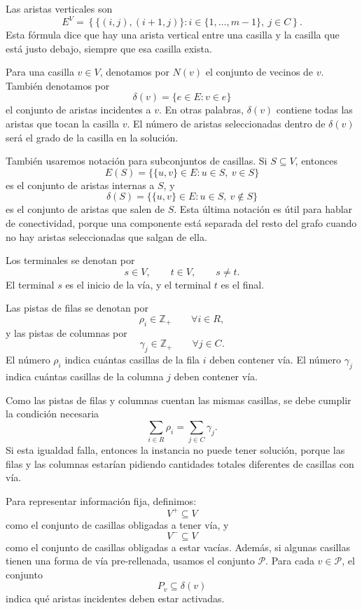Las aristas verticales son
\[
    E^V =
    \left\{
        \{(i,j),(i+1,j)\} :
        i \in \{1,\dots,m-1\},\ j \in C
    \right\}.
\]
Esta fórmula dice que hay una arista vertical entre una casilla y la casilla que está justo debajo, siempre que esa casilla exista.

Para una casilla \(v \in V\), denotamos por \(N(v)\) el conjunto de vecinos de \(v\). También denotamos por
\[
    \delta(v) = \{e \in E : v \in e\}
\]
el conjunto de aristas incidentes a \(v\). En otras palabras, \(\delta(v)\) contiene todas las aristas que tocan la casilla \(v\). El número de aristas seleccionadas dentro de \(\delta(v)\) será el grado de la casilla en la solución.

También usaremos notación para subconjuntos de casillas. Si \(S \subseteq V\), entonces
\[
    E(S) = \{\{u,v\} \in E : u \in S,\ v \in S\}
\]
es el conjunto de aristas internas a \(S\), y
\[
    \delta(S) = \{\{u,v\} \in E : u \in S,\ v \notin S\}
\]
es el conjunto de aristas que salen de \(S\). Esta última notación es útil para hablar de conectividad, porque una componente está separada del resto del grafo cuando no hay aristas seleccionadas que salgan de ella.

Los terminales se denotan por
\[
    s \in V,
    \qquad
    t \in V,
    \qquad
    s \neq t.
\]
El terminal \(s\) es el inicio de la vía, y el terminal \(t\) es el final.

Las pistas de filas se denotan por
\[
    \rho_i \in \mathbb{Z}_{+}
    \qquad \forall i \in R,
\]
y las pistas de columnas por
\[
    \gamma_j \in \mathbb{Z}_{+}
    \qquad \forall j \in C.
\]
El número \(\rho_i\) indica cuántas casillas de la fila \(i\) deben contener vía. El número \(\gamma_j\) indica cuántas casillas de la columna \(j\) deben contener vía.

Como las pistas de filas y columnas cuentan las mismas casillas, se debe cumplir la condición necesaria
\[
    \sum_{i \in R} \rho_i
    =
    \sum_{j \in C} \gamma_j.
\]
Si esta igualdad falla, entonces la instancia no puede tener solución, porque las filas y las columnas estarían pidiendo cantidades totales diferentes de casillas con vía.

Para representar información fija, definimos:
\[
    V^{+} \subseteq V
\]
como el conjunto de casillas obligadas a tener vía, y
\[
    V^{-} \subseteq V
\]
como el conjunto de casillas obligadas a estar vacías. Además, si algunas casillas tienen una forma de vía pre-rellenada, usamos el conjunto \(\mathcal{P}\). Para cada \(v \in \mathcal{P}\), el conjunto
\[
    P_v \subseteq \delta(v)
\]
indica qué aristas incidentes deben estar activadas.

